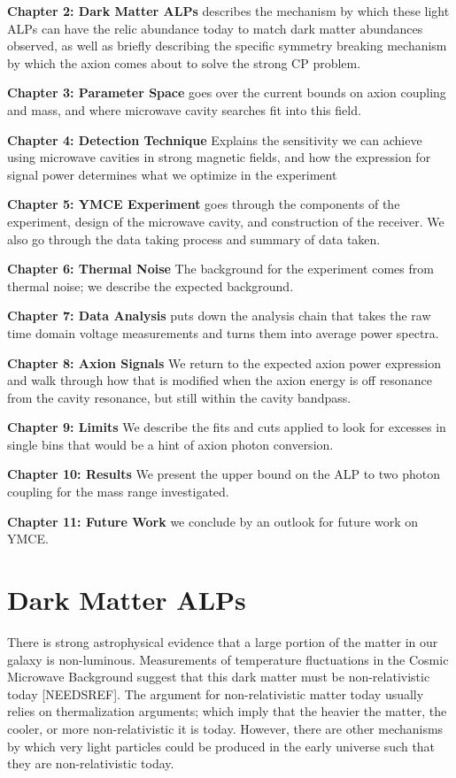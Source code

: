 \documentclass[11pt]{book}
\begin{document}
\textbf{Chapter 2: Dark Matter ALPs} describes the mechanism by which these light ALPs can have the relic abundance today to match dark matter abundances observed, as well as briefly describing the specific symmetry breaking mechanism by which the axion comes about to solve the strong CP problem.

\textbf{Chapter 3: Parameter Space} goes over the current bounds on axion coupling and mass, and where microwave cavity searches fit into this field.

\textbf{Chapter 4: Detection Technique} Explains the sensitivity we can achieve using microwave cavities in strong magnetic fields, and how the expression for signal power determines what we optimize in the experiment

\textbf{Chapter 5: YMCE Experiment} goes through the components of the experiment, design of the microwave cavity, and construction of the receiver. We also go through the data taking process and summary of data taken.

\textbf{Chapter 6: Thermal Noise} The background for the experiment comes from thermal noise; we describe the expected background.

\textbf{Chapter 7: Data Analysis} puts down the analysis chain that takes the raw time domain voltage measurements and turns them into average power spectra. 

\textbf{Chapter 8: Axion Signals} We return to the expected axion power expression and walk through how that is modified when the axion energy is off resonance from the cavity resonance, but still within the cavity bandpass.

\textbf{Chapter 9:  Limits} We describe the fits and cuts applied to look for excesses in single bins that would be a hint of axion photon conversion.

\textbf{Chapter 10: Results} We present the upper bound on the ALP to two photon coupling for the mass range investigated.

\textbf{Chapter 11: Future Work} we conclude by an outlook for future work on YMCE.

\section{Dark Matter ALPs}

There is strong astrophysical evidence that a large portion of the matter in our galaxy is non-luminous. Measurements of temperature fluctuations in the Cosmic Microwave Background suggest that this dark matter must be non-relativistic today [NEEDSREF]. The argument for non-relativistic matter today usually relies on thermalization arguments; which imply that the heavier the matter, the cooler, or more non-relativistic it is today. However, there are other mechanisms by which very light particles could be produced in the early universe such that they are non-relativistic today.
\end{document}
